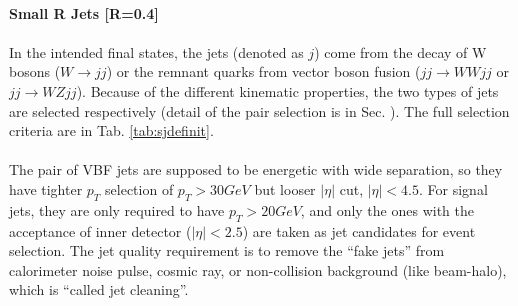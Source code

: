 \noindent
\\{\bf Small R Jets [R=0.4]}
\\
\\In the intended final states, the jets (denoted as $j$) come from the decay of W bosons ($W\to jj$) or the remnant quarks from vector boson fusion ($jj\to WWjj$ or $jj \to WZjj$). Because of the different kinematic properties, the two types of jets are selected respectively (detail of the pair selection is in Sec. ). The full selection criteria are in Tab. \ref{tab:sjdefinit}.
\\
\\The pair of VBF jets are supposed to be energetic with wide separation, so they have tighter $p_{T}$ selection of $p_{T}>30GeV$ but looser $|\eta|$ cut, $|\eta|<4.5$. For signal jets, they are only required to have $p_{T}>20GeV$, and only the ones with the acceptance of inner detector ($|\eta|<2.5$) are taken as jet candidates for event selection. The jet quality requirement is to remove the ``fake jets'' from calorimeter noise pulse, cosmic ray, or non-collision background (like beam-halo), which is ``called jet cleaning''.

